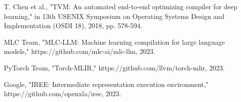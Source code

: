 \documentclass[conference]{IEEEtran}
\begin{document}
\begin{thebibliography}{00}
 T. Chen et al., "TVM: An automated end-to-end optimizing compiler for deep learning," in 13th USENIX Symposium on Operating Systems Design and Implementation (OSDI 18), 2018, pp. 578-594.

 MLC Team, "MLC-LLM: Machine learning compilation for large language models," https://github.com/mlc-ai/mlc-llm, 2023.

 PyTorch Team, "Torch-MLIR," https://github.com/llvm/torch-mlir, 2023.

 Google, "IREE: Intermediate representation execution environment," https://github.com/openxla/iree, 2023.

\end{thebibliography}
\end{document}
